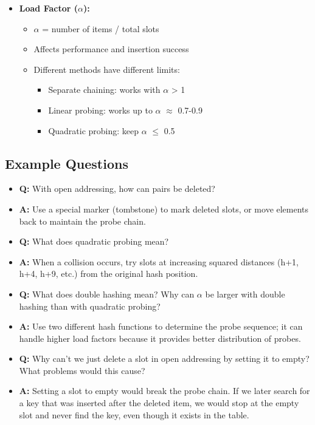 \documentclass[11pt,a4paper]{article}
\begin{document}
\begin{multicols}{2}
\begin{itemize}
    \item \textbf{Load Factor ($\alpha$):}
    \begin{itemize}
        \item $\alpha$ = number of items / total slots
        \item Affects performance and insertion success
        \item Different methods have different limits:
        \begin{itemize}
            \item Separate chaining: works with $\alpha$ > 1
            \item Linear probing: works up to $\alpha$ $\approx$ 0.7-0.9
            \item Quadratic probing: keep $\alpha$ $\leq$ 0.5
        \end{itemize}
    \end{itemize}
\end{itemize}

\subsection{Example Questions}
\begin{itemize}
    \item \textbf{Q:} With open addressing, how can pairs be deleted?
    \item \textbf{A:} Use a special marker (tombstone) to mark deleted slots, or move elements back to maintain the probe chain.

    \item \textbf{Q:} What does quadratic probing mean?
    \item \textbf{A:} When a collision occurs, try slots at increasing squared distances (h+1, h+4, h+9, etc.) from the original hash position.

    \item \textbf{Q:} What does double hashing mean? Why can $\alpha$ be larger with double hashing than with quadratic probing?
    \item \textbf{A:} Use two different hash functions to determine the probe sequence; it can handle higher load factors because it provides better distribution of probes.

    \item \textbf{Q:} Why can't we just delete a slot in open addressing by setting it to empty? What problems would this cause?
    \item \textbf{A:} Setting a slot to empty would break the probe chain. If we later search for a key that was inserted after the deleted item, we would stop at the empty slot and never find the key, even though it exists in the table.


\end{itemize}
\end{multicols}
\end{document}
